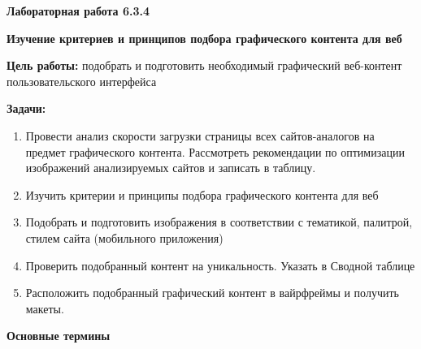 
\graphicspath{ {6.3.4/models/} }

\pagestyle{fancy}
\fancyhead{}
\renewcommand{\headrulewidth}{0pt}


\begin{center}
    \textbf{Лабораторная работа 6.3.4}

    \textbf{Изучение критериев и принципов подбора графического контента для веб}
\end{center}

\textbf{Цель работы:} подобрать  и подготовить необходимый графический веб-контент пользовательского интерфейса
\bigskip

\textbf{Задачи:}

\begin{enumerate}
    \item Провести анализ скорости загрузки страницы всех сайтов-аналогов на предмет графического контента. Рассмотреть рекомендации по оптимизации изображений анализируемых сайтов и записать в таблицу.
    \item Изучить критерии и принципы подбора графического контента для веб
    \item Подобрать и подготовить изображения в соответствии с тематикой, палитрой, стилем сайта (мобильного приложения) 
    \item Проверить подобранный контент на уникальность. Указать в Сводной таблице
    \item Расположить подобранный графический контент в вайрфреймы и получить макеты.
\end{enumerate}
\bigskip

\textbf{Основные термины}

